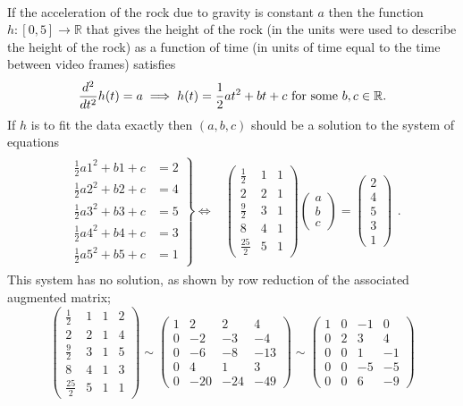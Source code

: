 \documentclass[12pt]{article}
\def\R{{\mathbb{R}}}
\def\b{\beta}
\def\bea{\begin{eqnarray}}
\def\eea{\end{eqnarray}}
\def\nn{\nonumber}
\def\baa{\left(\begin{array}{ccc}}
\def\eaa{\end{array}\right) }
\def\bv{\left(\begin{array}{c}}
\def\ev{\end{array}\right) }
\def\LR{\Leftrightarrow}
\begin{document}
\\
If the acceleration of the rock due to gravity is constant $a$ then the function $h:[0,5]\to \R$ that gives the height of the rock (in the units were used to describe the height of the rock) as a function of time (in units of time equal to the time between video frames) satisfies 
$$ \frac{d^2}{dt^2} h(t)=a \implies h(t)=\frac12 a t^2+bt+c {\rm ~for~some ~}b,c\in \R.$$
If $h$ is to fit the data exactly then $(a,b,c)$ should be a solution to the system of equations 
\bea \nn
\begin{array}{cc}
\left.
\begin{array}{cc}
\frac12a 1^2+b1+c &= 2 \\
\frac12a 2^2+b2+c &= 4 \\
\frac12a 3^2+b3+c &= 5 \\
\frac12a 4^2+b4+c &= 3 \\
\frac12a 5^2+b5+c &= 1 
\end{array}
\right\}\LR
& 
\baa
\frac12 &1&1\\
2&2&1\\
\frac92 &3&1\\
8&4&1\\
\frac{25}{2} &5&1
\eaa
\bv a\\b\\c \ev = \bv 2\\4\\5\\3\\1\ev
\end{array}.
\eea
This system has no solution, as shown by row reduction of the associated augmented matrix; 
$$
\left( \begin{array}{rrr|c}
\frac12 &1&1&2\\
2&2&1&4\\
\frac92 &3&1&5\\
8&4&1&3\\
\frac{25}{2} &5&1&1
\end{array} \right)
\sim 
\left( \begin{array}{rrr|r}
1 &2&2&4\\
0      &-2&-3&-4\\
0&-6&-8&-13\\
0&4&1&3\\
0&-20&-24&-49
\end{array} \right)
%
\sim 
\left( \begin{array}{rrr|r}
1 &0&-1&0\\
0      &2&3&4\\
0&0&1&-1\\
0&0&-5&-5\\
0&0&6&-9
\end{array} \right)
$$
\end{document}

